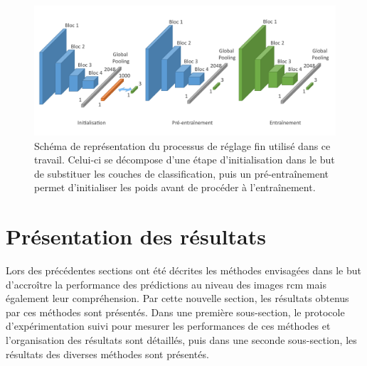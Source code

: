 \begin{figure}[H]
    \centering
    \includegraphics[width=\linewidth]{contents/chapter_6/resources/scheme_image_improvement_image_fine_tune.pdf}
    \caption{Schéma de représentation du processus de réglage fin utilisé dans ce travail. Celui-ci se décompose d'une étape d'initialisation dans le but de substituer les couches de classification, puis un pré-entraînement permet d'initialiser les poids avant de procéder à l'entraînement.}
    \label{fig:scheme_image_fine_tune}
\end{figure}\par
\clearpage

\section{Présentation des résultats}
Lors des précédentes sections ont été décrites les méthodes envisagées dans le but d'accroître la performance des prédictions au niveau des images \gls{rcm} mais également leur compréhension. Par cette nouvelle section, les résultats obtenus par ces méthodes sont présentés. Dans une première sous-section, le protocole d'expérimentation suivi pour mesurer les performances de ces méthodes et l'organisation des résultats sont détaillés, puis dans une seconde sous-section, les résultats des diverses méthodes sont présentés.\par

